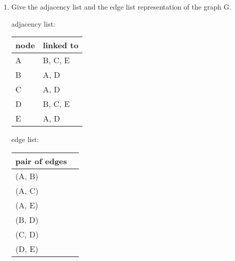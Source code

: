 \begin{enumerate}
	\item Give the adjacency list and the edge list representation of the graph G.
	
	adjacency list:
	
	\begin{tabular}{ | m{3cm} | m{3cm} | } 
		\hline
		node & linked to \\ 
		\hline
		A & B, C, E \\ 
		\hline
		B & A, D \\ 
		\hline
		C & A, D \\ 
		\hline
		D & B, C, E \\ 
		\hline
		E & A, D \\ 
		\hline
	\end{tabular}

	edge list:

	\begin{tabular}{ | m{3cm} | m{3cm} | } 
		\hline
		pair of edges \\ 
		\hline
		(A, B) \\ 
		\hline
		(A, C) \\ 
		\hline
		(A, E) \\ 
		\hline
		(B, D) \\ 
		\hline
		(C, D) \\ 
		\hline
		(D, E) \\ 
		\hline
	\end{tabular}
	
\end{enumerate}